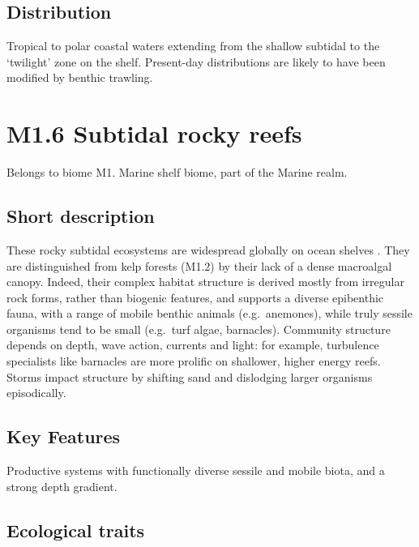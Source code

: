 \documentclass[
  letterpaper,
  DIV=11,
  numbers=noendperiod]{scrartcl}
\begin{document}
\subsection{Distribution}\label{distribution-30}

Tropical to polar coastal waters extending from the shallow subtidal to
the `twilight' zone on the shelf. Present-day distributions are likely
to have been modified by benthic trawling.

\section{M1.6 Subtidal rocky reefs}\label{m1.6-subtidal-rocky-reefs}

Belongs to biome M1. Marine shelf biome, part of the Marine realm.

\subsection{Short description}\label{short-description-31}

These rocky subtidal ecosystems are widespread globally on ocean shelves
. They are distinguished from kelp forests (M1.2) by their lack of a
dense macroalgal canopy. Indeed, their complex habitat structure is
derived mostly from irregular rock forms, rather than biogenic features,
and supports a diverse epibenthic fauna, with a range of mobile benthic
animals (e.g.~anemones), while truly sessile organisms tend to be small
(e.g.~turf algae, barnacles). Community structure depends on depth, wave
action, currents and light: for example, turbulence specialists like
barnacles are more prolific on shallower, higher energy reefs. Storms
impact structure by shifting sand and dislodging larger organisms
episodically.

\subsection{Key Features}\label{key-features-31}

Productive systems with functionally diverse sessile and mobile biota,
and a strong depth gradient.

\subsection{Ecological traits}\label{ecological-traits-31}
\end{document}

